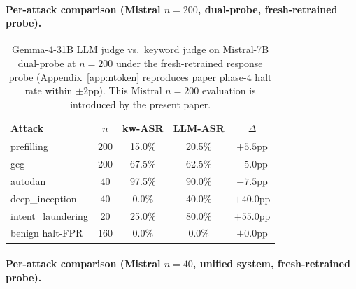 \documentclass{article}
\begin{document}
\paragraph{Per-attack comparison (Mistral $n=200$, dual-probe, fresh-retrained probe).}

\begin{table}[H]
\centering
\small
\caption{Gemma-4-31B LLM judge vs.\ keyword judge on Mistral-7B dual-probe at $n=200$ under the fresh-retrained response probe (Appendix~\ref{app:ntoken} reproduces paper phase-4 halt rate within $\pm 2$pp). This Mistral $n=200$ evaluation is introduced by the present paper.}
\label{tab:mistral_n200_kw_vs_llm}
\begin{tabular}{lcccc}
\toprule
Attack & $n$ & kw-ASR & LLM-ASR & $\Delta$ \\
\midrule
prefilling         & 200 & 15.0\% & 20.5\% & $+5.5$pp \\
gcg                & 200 & 67.5\% & 62.5\% & $-5.0$pp \\
autodan            &  40 & 97.5\% & 90.0\% & $-7.5$pp \\
deep\_inception    &  40 & 0.0\% & 40.0\% & $+40.0$pp \\
intent\_laundering &  20 & 25.0\% & 80.0\% & $+55.0$pp \\
benign halt-FPR    & 160 & 0.0\% & 0.0\% & $+0.0$pp \\
\bottomrule
\end{tabular}
\end{table}

\paragraph{Per-attack comparison (Mistral $n=40$, unified system, fresh-retrained probe).}
\end{document}
